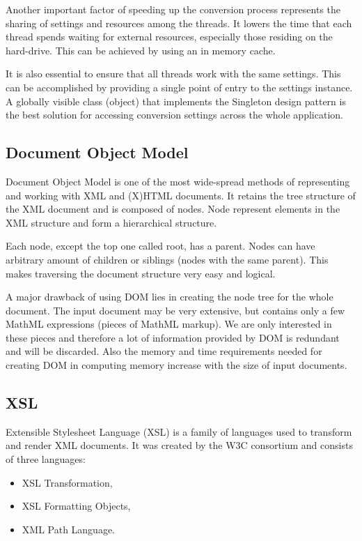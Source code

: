\documentclass[11pt,oneside,final]{fithesis2}
\begin{document}
Another important factor of speeding up the conversion process represents the sharing of settings and resources among the threads. It lowers the time that each thread spends waiting for external resources, especially those residing on the hard-drive. This can be achieved by using an in memory cache.

It is also essential to ensure that all threads work with the same settings. This can be accomplished by providing a single point of entry to the settings instance. A globally visible class (object) that implements the Singleton design pattern is the best solution for accessing conversion settings across the whole application.

\subsection{Document Object Model}
Document Object Model is one of the most wide-spread methods of representing and working with XML and (X)HTML documents. It retains the tree structure of the XML document and is composed of nodes. Node represent elements in the XML structure and form a hierarchical structure. 

Each node, except the top one called root, has a parent. Nodes can have arbitrary amount of children or siblings (nodes with the same parent). This makes traversing the document structure very easy and logical. 

A major drawback of using DOM lies in creating the node tree for the whole document. The input document may be very extensive, but contains only a few MathML expressions (pieces of MathML markup). We are only interested in these pieces and therefore a lot of information provided by DOM is redundant and will be discarded. Also the memory and time requirements needed for creating DOM in computing memory increase with the size of input documents.

\subsection{XSL}
\label{section:xsl}
Extensible Stylesheet Language (XSL) is a family of languages used to transform and render XML documents. It was created by the W3C consortium and consists of three languages:
\begin{itemize}
\item XSL Transformation,
\item XSL Formatting Objects,
\item XML Path Language.
\end{itemize}
\end{document}
